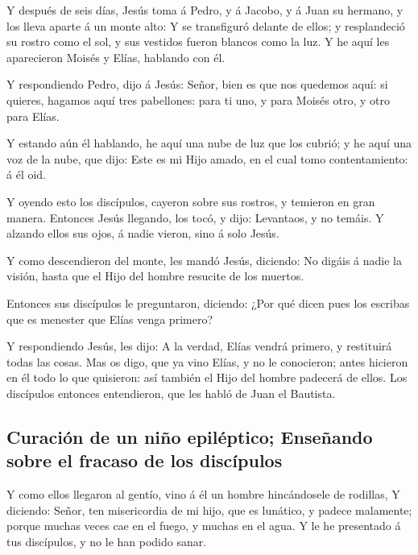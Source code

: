  Y después de seis días, Jesús toma á Pedro, y á Jacobo, y á
Juan su hermano, y los lleva aparte á un monte alto:  Y se
transfiguró delante de ellos; y resplandeció su rostro como el sol, y
sus vestidos fueron blancos como la luz.  Y he aquí les
aparecieron Moisés y Elías, hablando con él.

 Y respondiendo Pedro, dijo á Jesús: Señor, bien es que nos
quedemos aquí: si quieres, hagamos aquí tres pabellones: para ti uno, y
para Moisés otro, y otro para Elías.

 Y estando aún él hablando, he aquí una nube de luz que los
cubrió; y he aquí una voz de la nube, que dijo: Este es mi Hijo amado,
en el cual tomo contentamiento: á él oid.

 Y oyendo esto los discípulos, cayeron sobre sus rostros, y
temieron en gran manera.  Entonces Jesús llegando, los tocó,
y dijo: Levantaos, y no temáis.  Y alzando ellos sus ojos, á
nadie vieron, sino á solo Jesús.

 Y como descendieron del monte, les mandó Jesús, diciendo:
No digáis á nadie la visión, hasta que el Hijo del hombre resucite de
los muertos.

 Entonces sus discípulos le preguntaron, diciendo: ¿Por qué
dicen pues los escribas que es menester que Elías venga primero?

 Y respondiendo Jesús, les dijo: A la verdad, Elías vendrá
primero, y restituirá todas las cosas.  Mas os digo, que ya
vino Elías, y no le conocieron; antes hicieron en él todo lo que
quisieron: así también el Hijo del hombre padecerá de ellos.
 Los discípulos entonces entendieron, que les habló de Juan
el Bautista.

\hypertarget{curaciuxf3n-de-un-niuxf1o-epiluxe9ptico-enseuxf1ando-sobre-el-fracaso-de-los-discuxedpulos}{%
\subsection{Curación de un niño epiléptico; Enseñando sobre el fracaso
de los
discípulos}\label{curaciuxf3n-de-un-niuxf1o-epiluxe9ptico-enseuxf1ando-sobre-el-fracaso-de-los-discuxedpulos}}

 Y como ellos llegaron al gentío, vino á él un hombre
hincándosele de rodillas,  Y diciendo: Señor, ten
misericordia de mi hijo, que es lunático, y padece malamente; porque
muchas veces cae en el fuego, y muchas en el agua.  Y le he
presentado á tus discípulos, y no le han podido sanar.

